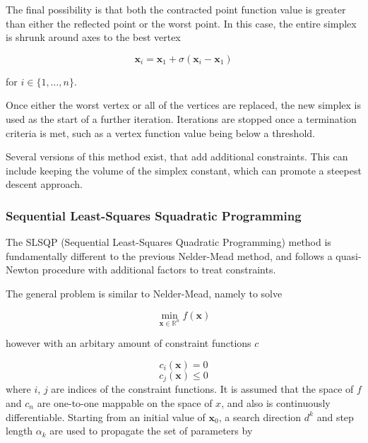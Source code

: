 The final possibility is that both the contracted point function value is greater 
than either the reflected point or the worst point. In this case, the entire simplex
is shrunk around axes to the best vertex

\begin{equation}
\mathbf{x}_i = \mathbf{x}_1 + \sigma \left(\mathbf{x}_i - \mathbf{x}_1 \right)
\end{equation}

for $i \in \{1, \dots, n\}$.

Once either the worst vertex or all of the vertices are replaced, the new simplex
is used as the start of a further iteration. Iterations are stopped once a termination
criteria is met, such as a vertex function value being below a threshold.

Several versions of this method exist, that add additional constraints. This can
include keeping the volume of the simplex constant, which can promote a steepest
descent approach.

\subsubsection{Sequential Least-Squares Squadratic Programming}
\label{subsubsec:slsqp}
The SLSQP (Sequential Least-Squares Quadratic Programming) method is fundamentally
different to the previous Nelder-Mead method, and follows a quasi-Newton procedure
with additional factors to treat constraints.

The general problem is similar to Nelder-Mead, namely to solve

\begin{equation}
\min_{\mathbf{x} \in \mathbb{R}^n} f\left( \mathbf{x}\right)
\end{equation}

however with an arbitary amount of constraint functions $c$

\begin{equation}
c_i \left(\mathbf{x} \right) = 0
\end{equation}
\begin{equation}
c_j \left(\mathbf{x} \right) \leq 0
\end{equation}
%
where $i$, $j$ are indices of the constraint functions.
It is assumed that the space of $f$ and $c_n$ are one-to-one mappable on the
space of $x$, and also is continuously differentiable. Starting from an initial
value of $\mathbf{x}_0$, a search direction $d^k$ and step length $\alpha_k$ are
used to propagate the set of parameters by

